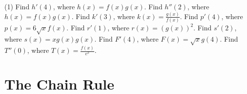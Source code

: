 \documentclass[10pt,oneside,]{book}
\theoremstyle{plain}
\theoremstyle{definition}
\numberwithin{equation}{section}
\newcommand{\fe}[2]{#1\mathopen{}\left(#2\right)\mathclose{}}
\newcommand{\fd}[1]{#1'}
\newcommand{\sd}[1]{#1''}
\begin{document}
\begin{exercisegroup}(1)
\exercise[33.]\hypertarget{exercise-433}{\null}Find \(\fe{\fd{h}}{4}\), where \(\fe{h}{x}=\fe{f}{x}\fe{g}{x}\).%
\exercise[34.]\hypertarget{exercise-434}{\null}Find \(\fe{\sd{h}}{2}\), where \(\fe{h}{x}=\fe{f}{x}\fe{g}{x}\).%
\exercise[35.]\hypertarget{exercise-435}{\null}Find \(\fe{\fd{k}}{3}\), where \(\fe{k}{x}=\frac{\fe{g}{x}}{\fe{f}{x}}\).%
\exercise[36.]\hypertarget{exercise-436}{\null}Find \(\fe{\fd{p}}{4}\), where \(\fe{p}{x}=6\sqrt{x}\fe{f}{x}\).%
\exercise[37.]\hypertarget{exercise-437}{\null}Find \(\fe{\fd{r}}{1}\), where \(\fe{r}{x}=\left(\fe{g}{x}\right)^2\).%
\exercise[38.]\hypertarget{exercise-438}{\null}Find \(\fe{\fd{s}}{2}\), where \(\fe{s}{x}=x\fe{g}{x}\fe{g}{x}\).%
\exercise[39.]\hypertarget{exercise-439}{\null}Find \(\fe{\fd{F}}{4}\), where \(\fe{F}{x}=\sqrt{x}\fe{g}{4}\).%
\exercise[40.]\hypertarget{exercise-440}{\null}Find \(\fe{\sd{T}}{0}\), where \(\fe{T}{x}=\frac{\fe{f}{x}}{e^x}\).%
\end{exercisegroup}
\par\smallskip\noindent
\typeout{************************************************}
\typeout{************************************************}
\chapter[The Chain Rule]{The Chain Rule}\label{chapter-chain-rule}
\typeout{************************************************}
\typeout{************************************************}
\end{document}
